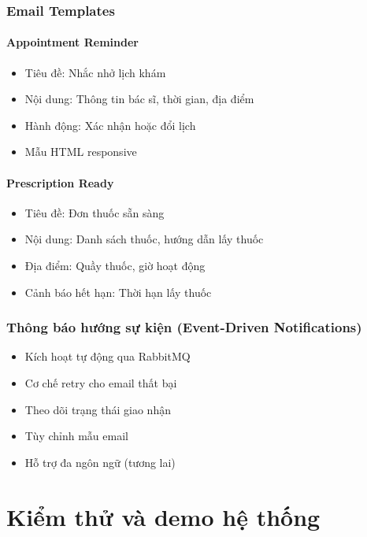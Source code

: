 \documentclass[12pt,a4paper]{report}
\begin{document}
    \subsection{Email Templates}
    \subsubsection{Appointment Reminder}
    \begin{itemize}
        \item Tiêu đề: Nhắc nhở lịch khám
        \item Nội dung: Thông tin bác sĩ, thời gian, địa điểm
        \item Hành động: Xác nhận hoặc đổi lịch
        \item Mẫu HTML responsive
    \end{itemize}

    \subsubsection{Prescription Ready}
    \begin{itemize}
        \item Tiêu đề: Đơn thuốc sẵn sàng
        \item Nội dung: Danh sách thuốc, hướng dẫn lấy thuốc
        \item Địa điểm: Quầy thuốc, giờ hoạt động
        \item Cảnh báo hết hạn: Thời hạn lấy thuốc
    \end{itemize}

    \subsection{Thông báo hướng sự kiện (Event-Driven Notifications)}
    \begin{itemize}
        \item Kích hoạt tự động qua RabbitMQ
        \item Cơ chế retry cho email thất bại
        \item Theo dõi trạng thái giao nhận
        \item Tùy chỉnh mẫu email
        \item Hỗ trợ đa ngôn ngữ (tương lai)
    \end{itemize}

    \chapter{Kiểm thử và demo hệ thống}
\end{document}
